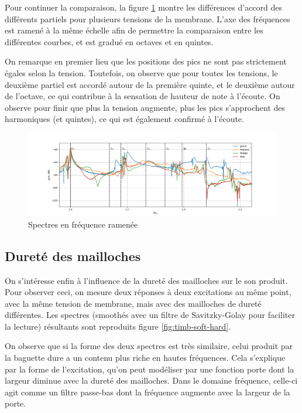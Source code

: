 \documentclass[atiam, article]{rapport} %
\begin{document}
Pour continuer la comparaison, la figure \ref{fig:comparaison-harmo-timbale} montre les différences d'accord des différents partiels pour plusieurs tensions de la membrane. L'axe des fréquences est ramené à la même échelle afin de permettre la comparaison entre les différentes courbes, et est gradué en octaves et en quintes.

On remarque en premier lieu que les positions des pics ne sont pas strictement égales selon la tension. Toutefois, on observe que pour toutes les tensions, le deuxième partiel est accordé autour de la première quinte, et le deuxième autour de l'octave, ce qui contribue à la sensation de hauteur de note à l'écoute. On observe pour finir que plus la tension augmente, plus les pics s'approchent des harmoniques (et quintes), ce qui est également confirmé à l'écoute.

\begin{figure}
  \begin{center}
    \includegraphics[width=\textwidth]{percu/comparaison-harmo-timbale.png}
  \end{center}
  \caption{Spectres en fréquence ramenée}
  \label{fig:comparaison-harmo-timbale}
\end{figure}

\subsection{Dureté des mailloches}

On s'intéresse enfin à l'influence de la dureté des mailloches sur le son produit. Pour observer ceci, on mesure deux réponses à deux excitations au même point, avec la même tension de membrane, mais avec des mailloches de dureté différentes. Les spectres (smoothés avec un filtre de Savitzky-Golay pour faciliter la lecture) résultants sont reproduits figure \ref{fig:timb-soft-hard}.

On observe que si la forme des deux spectres est très similaire, celui produit par la baguette dure a un contenu plus riche en hautes fréquences. Cela s'explique par la forme de l'excitation, qu'on peut modéliser par une fonction porte dont la largeur diminue avec la dureté des mailloches. Dans le domaine fréquence, celle-ci agit comme un filtre passe-bas dont la fréquence augmente avec la largeur de la porte.
\end{document}
